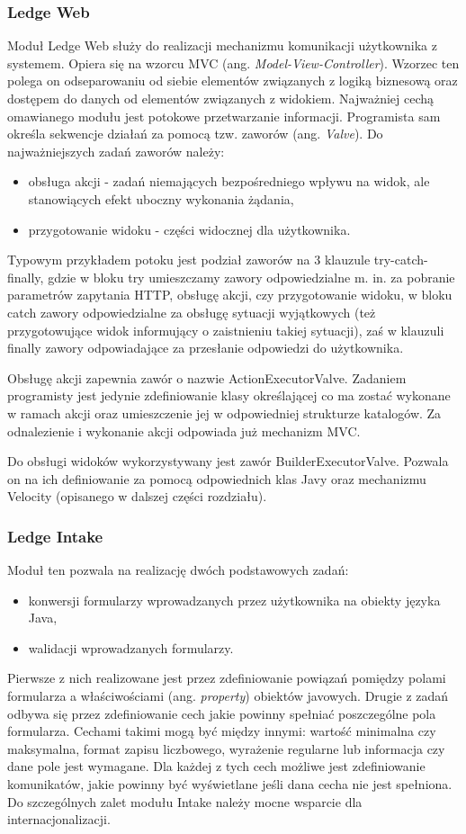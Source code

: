 \subsubsection{Ledge Web}
Moduł Ledge Web służy do realizacji mechanizmu komunikacji użytkownika z systemem. Opiera się na wzorcu MVC (ang. \textit{Model-View-Controller}). Wzorzec ten polega on odseparowaniu od siebie elementów związanych z logiką biznesową oraz dostępem do danych od elementów związanych z widokiem. Najważniej cechą omawianego modułu jest potokowe przetwarzanie informacji. Programista sam określa sekwencje działań za pomocą tzw. zaworów (ang. \textit{Valve}). Do najważniejszych zadań zaworów należy:
\begin{itemize}
	\item obsługa akcji - zadań niemających bezpośredniego wpływu na widok, ale stanowiących efekt uboczny wykonania żądania,
	\item przygotowanie widoku - części widocznej dla użytkownika.
\end{itemize}
Typowym przykładem potoku jest podział zaworów na 3 klauzule try-catch-finally, gdzie w bloku try umieszczamy zawory odpowiedzialne m. in. za pobranie parametrów zapytania HTTP, obsługę akcji, czy przygotowanie widoku, w bloku catch zawory odpowiedzialne za obsługę sytuacji wyjątkowych (też przygotowujące widok informujący o zaistnieniu takiej sytuacji), zaś w klauzuli finally zawory odpowiadające za przesłanie odpowiedzi do użytkownika.

Obsługę akcji zapewnia zawór o nazwie ActionExecutorValve. Zadaniem programisty jest jedynie zdefiniowanie klasy określającej co ma zostać wykonane w ramach akcji oraz umieszczenie jej w odpowiedniej strukturze katalogów. Za odnalezienie i wykonanie akcji odpowiada już mechanizm MVC.

Do obsługi widoków wykorzystywany jest zawór BuilderExecutorValve. Pozwala on na ich definiowanie za pomocą odpowiednich klas Javy oraz mechanizmu Velocity (opisanego w dalszej części rozdziału).

\subsubsection{Ledge Intake}
\label{intake}
Moduł ten pozwala na realizację dwóch podstawowych zadań:
\begin{itemize}
	\item konwersji formularzy wprowadzanych przez użytkownika na obiekty języka Java,
	\item walidacji wprowadzanych formularzy.
\end{itemize}
Pierwsze z nich realizowane jest przez zdefiniowanie powiązań pomiędzy polami formularza a właściwościami (ang. \textit{property}) obiektów javowych. Drugie z zadań odbywa się przez zdefiniowanie cech jakie powinny spełniać poszczególne pola formularza. Cechami takimi mogą być między innymi: wartość minimalna czy maksymalna,  format zapisu liczbowego, wyrażenie regularne lub informacja czy dane pole jest wymagane. Dla każdej z tych cech możliwe jest zdefiniowanie komunikatów, jakie powinny być wyświetlane jeśli dana cecha nie jest spełniona. Do szczególnych zalet modułu Intake należy mocne wsparcie dla internacjonalizacji.

